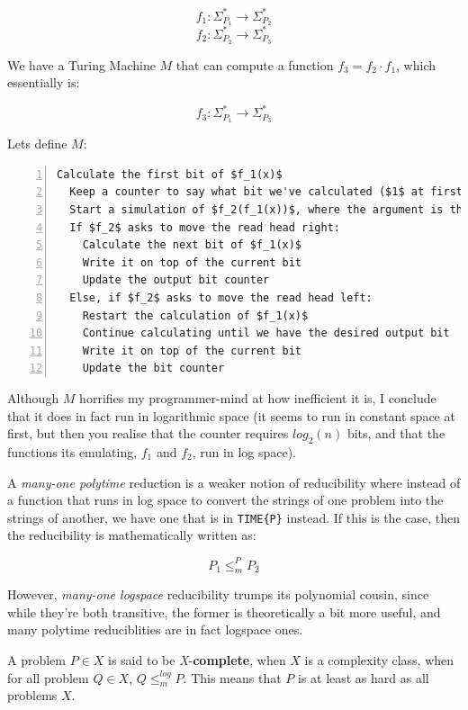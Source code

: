 \[
  f_1 : \Sigma^*_{P_1} \rightarrow \Sigma^*_{P_2}
\]
\[
  f_2 : \Sigma^*_{P_2} \rightarrow \Sigma^*_{P_3}
\]

We have a Turing Machine $M$ that can compute a function $f_3 = f_2 \cdot f_1$,
which essentially is:

\[
  f_3 : \Sigma^*_{P_1} \rightarrow \Sigma^*_{P_3}
\]

Lets define $M$:

\begin{lstlisting}[numbers=left,mathescape]
  Calculate the first bit of $f_1(x)$
  Keep a counter to say what bit we've calculated ($1$ at first)
  Start a simulation of $f_2(f_1(x))$, where the argument is the calculated bit
  If $f_2$ asks to move the read head right:
    Calculate the next bit of $f_1(x)$
    Write it on top of the current bit
    Update the output bit counter
  Else, if $f_2$ asks to move the read head left:
    Restart the calculation of $f_1(x)$
    Continue calculating until we have the desired output bit
    Write it on top of the current bit
    Update the bit counter
\end{lstlisting}

Although $M$ horrifies my programmer-mind at how inefficient it is, I conclude
that it does in fact run in logarithmic space (it seems to run in constant space
at first, but then you realise that the counter requires $log_2(n)$ bits, and
that the functions its emulating, $f_1$ and $f_2$, run in log space).

A \textit{many-one polytime} reduction is a weaker notion of reducibility where
instead of a function that runs in log space to convert the strings of one
problem into the strings of another, we have one that is in \texttt{TIME\{P\}}
instead. If this is the case, then the reducibility is mathematically written
as:

\[
  P_1 \leq_m^P P_2
\]


However, \textit{many-one logspace} reducibility trumps its polynomial cousin,
since while they're both transitive, the former is theoretically a bit more
useful, and many polytime reduciblities are in fact logspace ones.

A problem $P \in X$ is said to be \textit{X}-\textbf{complete}, when $X$ is a
complexity class, when for all problem $Q \in X$, $Q \leq_m^{log} P$. This means
that $P$ is at least as hard as all problems $X$.

